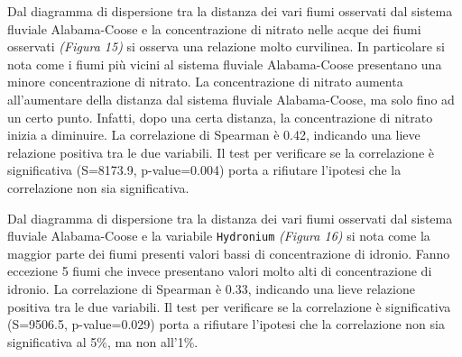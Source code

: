 \documentclass{article} %
\begin{document}
Dal diagramma di dispersione tra la distanza dei vari fiumi osservati dal sistema fluviale Alabama-Coose e la concentrazione di nitrato nelle acque dei fiumi osservati \textit{(Figura 15)} si osserva una relazione molto curvilinea.
In particolare si nota come i fiumi più vicini al sistema fluviale Alabama-Coose presentano una minore concentrazione di nitrato. La concentrazione di nitrato aumenta all'aumentare della distanza dal sistema fluviale Alabama-Coose, ma solo fino ad un certo punto. Infatti, dopo una certa distanza, la concentrazione di nitrato inizia a diminuire.
La correlazione di Spearman è 0.42, indicando una lieve relazione positiva tra le due variabili. 
Il test per verificare se la correlazione è significativa (S=8173.9, p-value=0.004) porta a rifiutare l'ipotesi che la correlazione non sia significativa.

Dal diagramma di dispersione tra la distanza dei vari fiumi osservati dal sistema fluviale Alabama-Coose e la variabile \texttt{Hydronium} \textit{(Figura 16)} si nota come la maggior parte dei fiumi presenti valori bassi di concentrazione di idronio. Fanno eccezione 5 fiumi che invece presentano valori molto alti di concentrazione di idronio. 
La correlazione di Spearman è 0.33, indicando una lieve relazione positiva tra le due variabili. 
Il test per verificare se la correlazione è significativa (S=9506.5, p-value=0.029) porta a rifiutare l'ipotesi che la correlazione non sia significativa al 5\%, ma non all'1\%.
\end{document}
